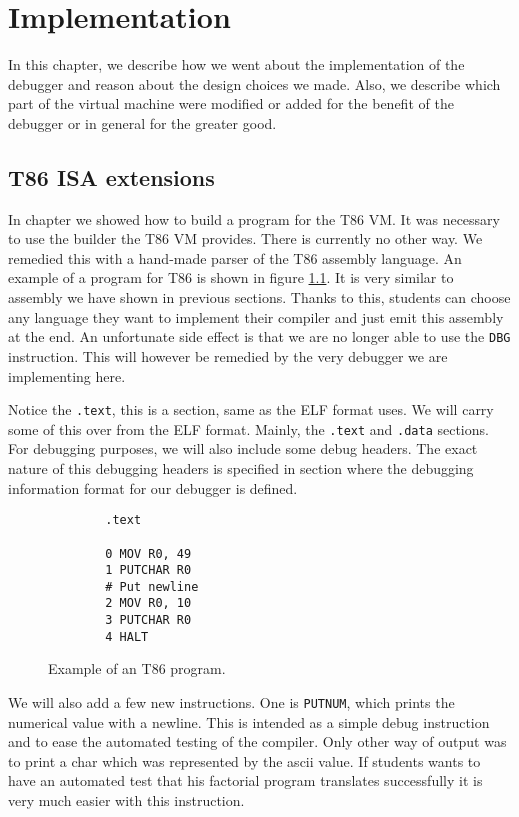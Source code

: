 \chapter{Implementation}
In this chapter, we describe how we went about the implementation
of the debugger and reason about the design choices we made.
Also, we describe which part of the virtual machine were
modified or added for the benefit of the debugger or in
general for the greater good.

\section{T86 ISA extensions}\label{section:parser}
In chapter  we showed how to build a program for the T86 VM. It was
necessary to use the builder the T86 VM provides. There is currently no other
way. We remedied this with a hand-made parser of the T86 assembly language. An
example of a program for T86 is shown in figure \ref{fig:t86-program}. It is
very similar to assembly we have shown in previous sections. Thanks to this,
students can choose any language they want to implement their compiler and just
emit this assembly at the end. An unfortunate side effect is that we are no
longer able to use the \texttt{DBG} instruction. This will however be remedied
by the very debugger we are implementing here. 

Notice the \texttt{.text}, this is a section, same as the ELF format uses. We
will carry some of this over from the ELF format. Mainly, the \texttt{.text}
and \texttt{.data} sections. For debugging purposes, we will also include some
debug headers. The exact nature of this debugging headers is specified in
section  where the debugging information format for our debugger is
defined.

\begin{figure}
    \begin{lstlisting}
        .text

        0 MOV R0, 49
        1 PUTCHAR R0
        # Put newline
        2 MOV R0, 10
        3 PUTCHAR R0
        4 HALT
    \end{lstlisting}
    \caption{Example of an T86 program.}
    \label{fig:t86-program}
\end{figure}

We will also add a few new instructions. One is \texttt{PUTNUM}, which prints
the numerical value with a newline. This is intended as a simple debug instruction
and to ease the automated testing of the compiler. Only other way of output was
to print a char which was represented by the ascii value. If students wants
to have an automated test that his factorial program translates successfully
it is very much easier with this instruction.

